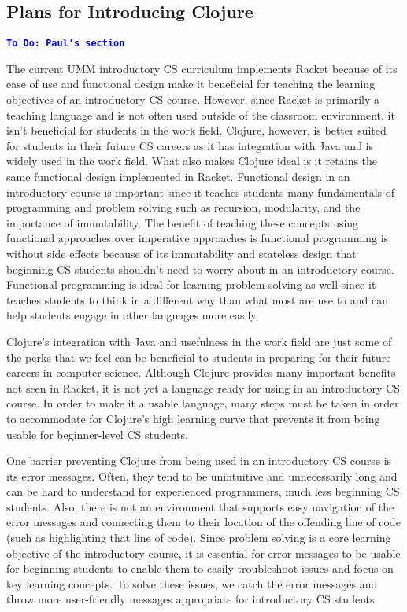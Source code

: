\documentclass[12pt]{article}
\newcommand{\comment}[1]{{\bf \tt  {#1}}}
\newcommand{\todo}[1]{\textcolor{blue}{\comment{To Do: {#1}}}}
\begin{document}
\subsection{Plans for Introducing Clojure}\label{subsec:plans}
\todo{Paul's section}

The current UMM introductory CS curriculum implements Racket because of its ease of use and functional design make it beneficial for teaching the learning objectives of an introductory CS course.  However, since Racket is primarily a teaching language and is not often used outside of the classroom environment, it isn’t beneficial for students in the work field. Clojure, however, is better suited for students in their future CS careers as it has integration with Java and is widely used in the work field. What also makes Clojure ideal is it retains the same functional design implemented in Racket. Functional design in an introductory course is important since it teaches students many fundamentals of programming and problem solving such as recursion, modularity, and the importance of immutability. The benefit of teaching these concepts using functional approaches over imperative approaches is functional programming is without side effects because of its immutability and stateless design that beginning CS students shouldn’t need to worry about in an introductory course. Functional programming is ideal for learning problem solving as well since it teaches students to think in a different way than what most are use to and can help students engage in other languages more easily.

Clojure’s integration with Java and usefulness in the work field are just some of the perks that we feel can be beneficial to students in preparing for their future careers in computer science.  Although Clojure provides many important benefits not seen in Racket, it is not yet a language ready for using in an introductory CS course. In order to make it a usable language, many steps must be taken in order to accommodate for Clojure’s high learning curve that prevents it from being usable for beginner-level CS students.

One barrier preventing Clojure from being used in an introductory CS course is its error messages. Often, they tend to be unintuitive and unnecessarily long and can be hard to understand for experienced programmers, much less beginning CS students. Also, there is not an environment that supports easy navigation of the error messages and connecting them to their location of the offending line of code (such as highlighting that line of code). Since problem solving is a core learning objective of the introductory course, it is essential for error messages to be usable for beginning students to enable them to easily troubleshoot issues and focus on key learning concepts. To solve these issues, we catch the error messages and throw more user-friendly messages appropriate for introductory CS students. 
\end{document}

